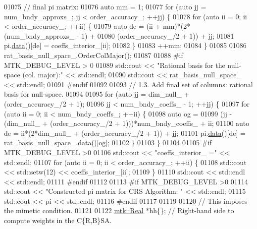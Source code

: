 \begin{DoxyCode}
{{01075   \textcolor{comment}{// final pi matrix:}
01076   \textcolor{keyword}{auto} mm = 1;
01077   \textcolor{keywordflow}{for} (\textcolor{keyword}{auto} jj = num\_bndy\_approxs\_; jj < order\_accuracy\_; ++jj) \{
01078     \textcolor{keywordflow}{for} (\textcolor{keyword}{auto} ii = 0; ii < order\_accuracy\_; ++ii) \{
01079       \textcolor{keyword}{auto} de = (ii + mm)*(2*(num\_bndy\_approxs\_ - 1) +
01080         (order\_accuracy\_/2 + 1)) + jj;
01081       pi.\hyperlink{classmtk_1_1DenseMatrix_a0c33b8a9e01d157c61ddbdf807c25d84}{data}()[de] = coeffs\_interior\_[ii];
01082     \}
01083     ++mm;
01084   \}
01085 
01086   rat\_basis\_null\_space\_.OrderColMajor();
01087 
01088 \textcolor{preprocessor}{  #if MTK\_DEBUG\_LEVEL > 0}
01089   std::cout << \textcolor{stringliteral}{"Rational basis for the null-space (col. major):"} << std::endl;
01090   std::cout << rat\_basis\_null\_space\_ << std::endl;
01091 \textcolor{preprocessor}{  #endif}
01092 
01093   \textcolor{comment}{// 1.3. Add final set of columns: rational basis for null-space.}
01094 
01095   \textcolor{keywordflow}{for} (\textcolor{keyword}{auto} jj = dim\_null\_ + (order\_accuracy\_/2 + 1);
01096        jj < num\_bndy\_coeffs\_ - 1; ++jj) \{
01097     \textcolor{keywordflow}{for} (\textcolor{keyword}{auto} ii = 0; ii < num\_bndy\_coeffs\_; ++ii) \{
01098       \textcolor{keyword}{auto} og =
01099         (jj - (dim\_null\_ + (order\_accuracy\_/2 + 1)))*num\_bndy\_coeffs\_ + ii;
01100       \textcolor{keyword}{auto} de = ii*(2*dim\_null\_ + (order\_accuracy\_/2 + 1)) + jj;
01101       pi.\hyperlink{classmtk_1_1DenseMatrix_a0c33b8a9e01d157c61ddbdf807c25d84}{data}()[de] = rat\_basis\_null\_space\_.data()[og];
01102     \}
01103   \}
01104 
01105 \textcolor{preprocessor}{  #if MTK\_DEBUG\_LEVEL >0}
01106   std::cout << \textcolor{stringliteral}{"coeffs\_interior\_ ="} << std::endl;
01107   \textcolor{keywordflow}{for} (\textcolor{keyword}{auto} ii = 0; ii < order\_accuracy\_; ++ii) \{
01108     std::cout << std::setw(12) << coeffs\_interior\_[ii];
01109   \}
01110   std::cout << std::endl << std::endl;
01111 \textcolor{preprocessor}{  #endif}
01112 
01113 \textcolor{preprocessor}{  #if MTK\_DEBUG\_LEVEL >0}
01114   std::cout << \textcolor{stringliteral}{"Constructed pi matrix for CRS Algorithm: "} << std::endl;
01115   std::cout << pi << std::endl;
01116 \textcolor{preprocessor}{  #endif}
01117 
01119 
01120   \textcolor{comment}{// This imposes the mimetic condition.}
01121 
01122   \hyperlink{group__c01-roots_gac080bbbf5cbb5502c9f00405f894857d}{mtk::Real} *hh\{\};  \textcolor{comment}{// Right-hand side to compute weights in the C\{R,B\}SA.}
}}
\end{DoxyCode}
